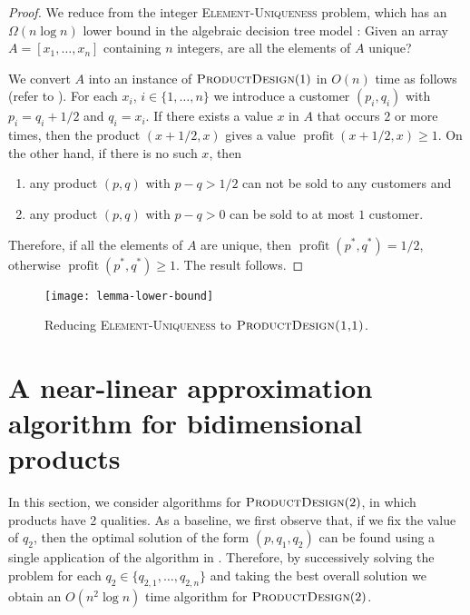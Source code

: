 \documentclass[lotsofwhite]{patmorin}
\newcommand{\val}{\operatorname{profit}}
\begin{document}
\begin{proof}
  We reduce from the integer \textsc{Element-Uniqueness} problem, which
  has an $\Omega(n\log n)$ lower bound in the algebraic decision tree
  model \cite{y91}: Given an array $A=[x_1,\ldots,x_n]$ containing
  $n$ integers, are all the elements of $A$ unique?

  We convert $A$ into an instance of $\textsc{ProductDesign}(1)$ in
  $O(n)$ time as follows (refer to ).  For each
  $x_i$, $i\in\{1,\ldots,n\}$ we introduce a customer $(p_i,q_i)$ with
  $p_i=q_i+1/2$ and $q_i=x_i$.  If there exists a value $x$ in $A$ that
  occurs $2$ or more times, then the product $(x+1/2,x)$ gives a value
  $\val(x+1/2,x) \ge 1$.  On the other hand, if there is no such $x$,
  then 
  \begin{enumerate} 
    \item any product $(p,q)$ with $p-q>1/2$ can not be sold to any
    customers and
    \item any product $(p,q)$ with $p-q>0$ can be sold to at most $1$
    customer.
  \end{enumerate} 
  Therefore, if all the elements of $A$ are unique, then $\val(p^*,q^*)
  = 1/2$, otherwise $\val(p^*,q^*) \ge 1$.  The result follows.
\end{proof}

\begin{figure}
  \begin{center}
    \texttt{[image: lemma-lower-bound]}
  \end{center}
  \caption{Reducing \textsc{Element-Uniqueness} to
           $\textsc{ProductDesign(1,1)}$.}
\end{figure}

\section{A near-linear approximation algorithm for bidimensional products}

In this section, we consider algorithms for $\textsc{ProductDesign}(2)$, in
which products have 2 qualities.  As a baseline, we first observe that, if
we fix the value of $q_2$, then the optimal solution of the form $(p, q_1,
q_2)$ can be found using a single application of the algorithm in
.  Therefore, by successively solving the problem for each $q_2
\in\{q_{2,1},\ldots,q_{2,n}\}$ and taking the best overall solution we
obtain an $O(n^2\log n)$ time algorithm for $\textsc{ProductDesign}(2)$.
\end{document}
